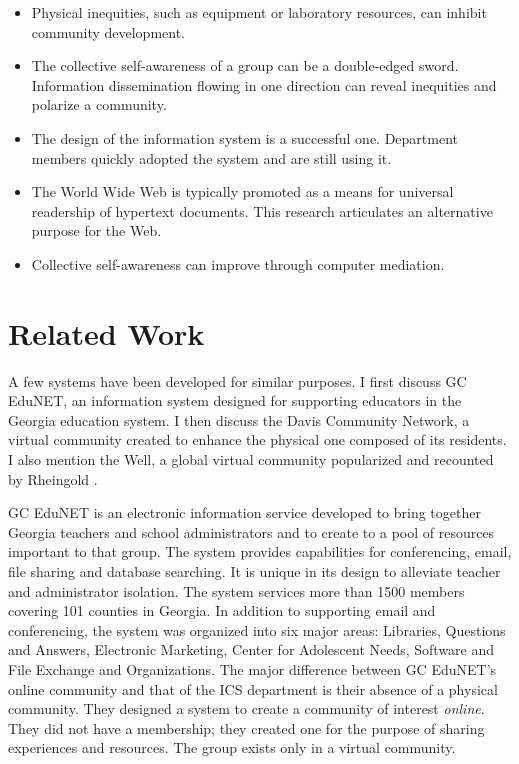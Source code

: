 \begin{itemize}
\item{Physical inequities, such as equipment or laboratory resources, can
  inhibit community development.}
\item{The collective self-awareness of a group can be a double-edged sword.
  Information dissemination flowing in one direction can reveal inequities
  and polarize a community.}
\item{The design of the information system is a successful one.  Department
  members quickly adopted the system and are still using it.}
\item{The World Wide Web is typically promoted as a means for universal
  readership of hypertext documents.  This research articulates an
  alternative purpose for the Web.}
\item{Collective self-awareness can improve through computer mediation.}
\end{itemize}

\section{Related Work}
A few systems have been developed for similar purposes.  I first discuss GC
EduNET, an information system designed for supporting educators in the Georgia
education system.  I then discuss the Davis Community Network, a virtual
community created to enhance the physical one composed of its residents.  I
also mention the Well, a global virtual community popularized and recounted by
Rheingold \cite{Rheingold93}.


GC EduNET \cite{Wolpert91} is an electronic information service developed to
bring together Georgia teachers and school administrators and to create to a
pool of resources important to that group.  The system provides capabilities
for conferencing, email, file sharing and database searching.  It is unique in
its design to alleviate teacher and administrator isolation.  The system
services more than 1500 members covering 101 counties in Georgia.  In addition
to supporting email and conferencing, the system was organized into six major
areas: Libraries, Questions and Answers, Electronic Marketing, Center for
Adolescent Needs, Software and File Exchange and Organizations.  The major
difference between GC EduNET's online community and that of the ICS department
is their absence of a physical community.  They designed a system to create a
community of interest {\em online}.  They did not have a membership; they
created one for the purpose of sharing experiences and resources.  The group
exists only in a virtual community.

